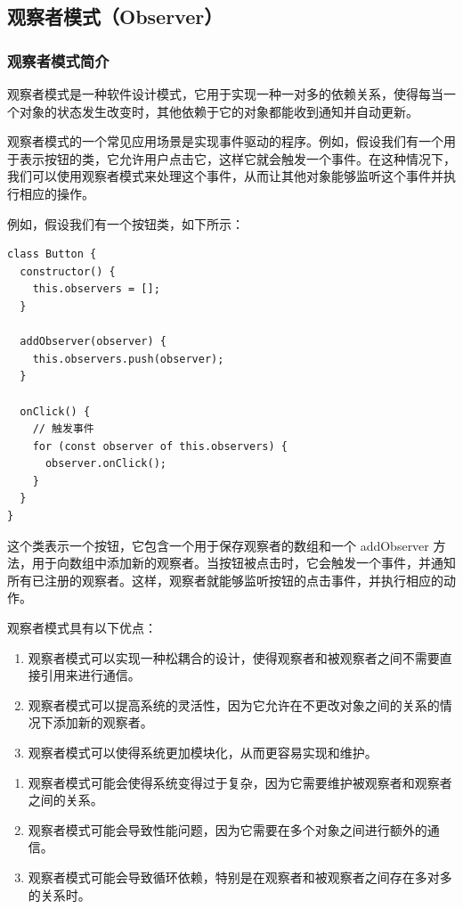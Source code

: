 \subsection{观察者模式（Observer）}

\subsubsection{观察者模式简介}

观察者模式是一种软件设计模式，它用于实现一种一对多的依赖关系，使得每当一个对象的状态发生改变时，其他依赖于它的对象都能收到通知并自动更新。

观察者模式的一个常见应用场景是实现事件驱动的程序。例如，假设我们有一个用于表示按钮的类，它允许用户点击它，这样它就会触发一个事件。在这种情况下，我们可以使用观察者模式来处理这个事件，从而让其他对象能够监听这个事件并执行相应的操作。

例如，假设我们有一个按钮类，如下所示：

\begin{lstlisting}
class Button {
  constructor() {
    this.observers = [];
  }

  addObserver(observer) {
    this.observers.push(observer);
  }

  onClick() {
    // 触发事件
    for (const observer of this.observers) {
      observer.onClick();
    }
  }
}
\end{lstlisting}


这个类表示一个按钮，它包含一个用于保存观察者的数组和一个 addObserver 方法，用于向数组中添加新的观察者。当按钮被点击时，它会触发一个事件，并通知所有已注册的观察者。这样，观察者就能够监听按钮的点击事件，并执行相应的动作。

观察者模式具有以下优点：

\begin{enumerate}
\item 观察者模式可以实现一种松耦合的设计，使得观察者和被观察者之间不需要直接引用来进行通信。
\item 观察者模式可以提高系统的灵活性，因为它允许在不更改对象之间的关系的情况下添加新的观察者。
\item 观察者模式可以使得系统更加模块化，从而更容易实现和维护。
\end{enumerate}

\begin{enumerate}
\item 观察者模式可能会使得系统变得过于复杂，因为它需要维护被观察者和观察者之间的关系。
\item 观察者模式可能会导致性能问题，因为它需要在多个对象之间进行额外的通信。
\item 观察者模式可能会导致循环依赖，特别是在观察者和被观察者之间存在多对多的关系时。
\end{enumerate}

